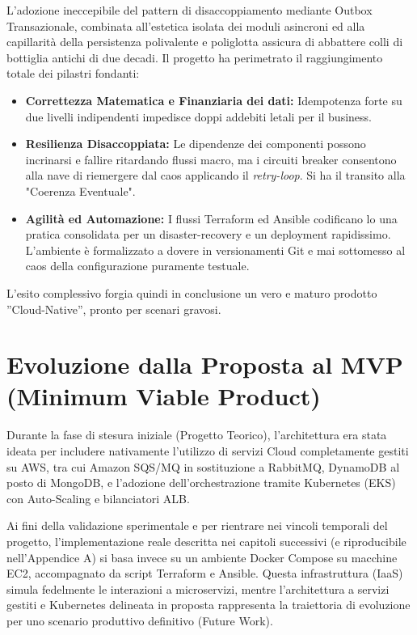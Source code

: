 \documentclass[11pt,a4paper]{report}
\begin{document}
L'adozione ineccepibile del pattern di disaccoppiamento mediante Outbox Transazionale, combinata all'estetica isolata dei moduli asincroni ed alla capillarit\`a della persistenza polivalente e poliglotta assicura di abbattere colli di bottiglia antichi di due decadi.
Il progetto ha perimetrato il raggiungimento totale dei pilastri fondanti:
\begin{itemize}
    \item \textbf{Correttezza Matematica e Finanziaria dei dati:} Idempotenza forte su due livelli indipendenti impedisce doppi addebiti letali per il business.
    \item \textbf{Resilienza Disaccoppiata:} Le dipendenze dei componenti possono incrinarsi e fallire ritardando flussi macro, ma i circuiti breaker consentono alla nave di riemergere dal caos applicando il \textit{retry-loop}. Si ha il transito alla "Coerenza Eventuale".
    \item \textbf{Agilit\`a ed Automazione:} I flussi Terraform ed Ansible codificano lo una pratica consolidata per un disaster-recovery e un deployment rapidissimo. L'ambiente \`e formalizzato a dovere in versionamenti Git e mai sottomesso al caos della configurazione puramente testuale.
\end{itemize}
L'esito complessivo forgia quindi in conclusione un vero e maturo prodotto ''Cloud-Native'', pronto per scenari gravosi.


\appendix

\section{Evoluzione dalla Proposta al MVP (Minimum Viable Product)}
Durante la fase di stesura iniziale (Progetto Teorico), l'architettura era stata ideata per includere nativamente l'utilizzo di servizi Cloud completamente gestiti su AWS, tra cui Amazon SQS/MQ in sostituzione a RabbitMQ, DynamoDB al posto di MongoDB, e l'adozione dell'orchestrazione tramite Kubernetes (EKS) con Auto-Scaling e bilanciatori ALB. 

Ai fini della validazione sperimentale e per rientrare nei vincoli temporali del progetto, l'implementazione reale descritta nei capitoli successivi (e riproducibile nell'Appendice A) si basa invece su un ambiente Docker Compose su macchine EC2, accompagnato da script Terraform e Ansible. Questa infrastruttura (IaaS) simula fedelmente le interazioni a microservizi, mentre l'architettura a servizi gestiti e Kubernetes delineata in proposta rappresenta la traiettoria di evoluzione per uno scenario produttivo definitivo (Future Work).
\end{document}
